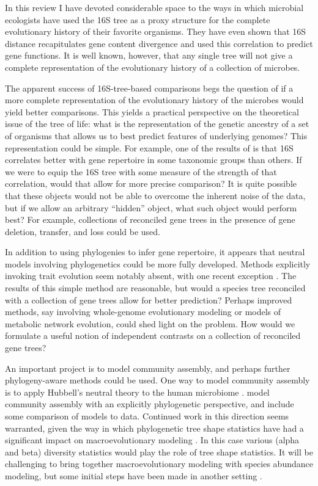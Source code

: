 \documentclass{amsart}
\begin{document}
In this review I have devoted considerable space to the ways in which microbial ecologists have used the 16S tree as a proxy structure for the complete evolutionary history of their favorite organisms.
They have even shown that 16S distance recapitulates gene content divergence and used this correlation to predict gene functions.
It is well known, however, that any single tree will not give a complete representation of the evolutionary history of a collection of microbes.

The apparent success of 16S-tree-based comparisons begs the question of if a more complete representation of the evolutionary history of the microbes would yield better comparisons.
This yields a practical perspective on the theoretical issue of the tree of life: what is the representation of the genetic ancestry of a set of organisms that allows us to best predict features of underlying genomes?
This representation could be simple.
For example, one of the results of \citet{zaneveld2010ribosomal} is that 16S correlates better with gene repertoire in some taxonomic groups than others.
If we were to equip the 16S tree with some measure of the strength of that correlation, would that allow for more precise comparison?
It is quite possible that these objects would not be able to overcome the inherent noise of the data, but if we allow an arbitrary ``hidden'' object, what such object would perform best?
For example, collections of reconciled gene trees in the presence of gene deletion, transfer, and loss \citep[see][for interesting recent results]{szollHosi2013efficient,szollHosi2013lateral} could be used.

In addition to using phylogenies to infer gene repertoire, it appears that neutral models involving phylogenetics could be more fully developed.
Methods explicitly invoking trait evolution seem notably absent, with one recent exception \citep{langille2013predictive}.
The results of this simple method are reasonable, but would a species tree reconciled with a collection of gene trees allow for better prediction?
Perhaps improved methods, say involving whole-genome evolutionary modeling or models of metabolic network evolution, could shed light on the problem.
How would we formulate a useful notion of independent contrasts \citep{felsenstein1985phylogenies} on a collection of reconciled gene trees?

An important project is to model community assembly, and perhaps further phylogeny-aware methods could be used.
One way to model community assembly is to apply Hubbell's neutral theory to the human microbiome \citep{fierer2012animalcules,costello2012application}.
\citet{o2012phylogenetic} model community assembly with an explicitly phylogenetic perspective, and include some comparison of models to data.
Continued work in this direction seems warranted, given the way in which phylogenetic tree shape statistics have had a significant impact on macroevolutionary modeling \citep{mooers1997inferring,aldous2011five}.
In this case various (alpha and beta) diversity statistics would play the role of tree shape statistics.
It will be challenging to bring together macroevolutionary modeling with species abundance modeling, but some initial steps have been made in another setting \citep{lambert2013predicting}.
\end{document}

